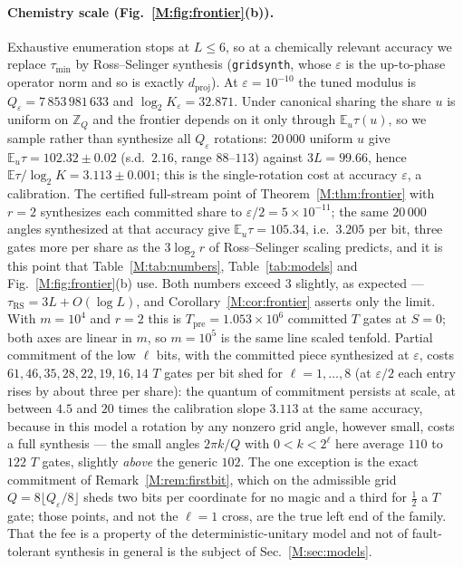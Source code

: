 \documentclass[aps,prx,twocolumn,superscriptaddress,nofootinbib,longbibliography]{revtex4-2}
\theoremstyle{plain}
\theoremstyle{definition}
\theoremstyle{remark}
\newcommand{\dproj}{d_{\mathrm{proj}}}
\newcommand{\Tpre}{T_{\mathrm{pre}}}
\newcommand{\E}{\mathbb{E}}
\newcommand{\Z}{\mathbb{Z}}
\begin{document}
\paragraph{Chemistry scale (Fig.~\ref{M:fig:frontier}(b)).} Exhaustive enumeration stops at $L\le6$, so at a chemically relevant accuracy we replace $\tau_{\min}$ by Ross--Selinger synthesis (\texttt{gridsynth}, whose $\varepsilon$ is the up-to-phase operator norm and so is exactly $\dproj$). At $\varepsilon=10^{-10}$ the tuned modulus is $Q_\varepsilon=7\,853\,981\,633$ and $\log_2K_\varepsilon=32.871$. Under canonical sharing the share $u$ is uniform on $\Z_Q$ and the frontier depends on it only through $\E_u\tau(u)$, so we sample rather than synthesize all $Q_\varepsilon$ rotations: $20\,000$ uniform $u$ give $\E_u\tau=102.32\pm0.02$ (s.d.\ $2.16$, range $88$--$113$) against $3L=99.66$, hence $\E\tau/\log_2K=3.113\pm0.001$; this is the single-rotation cost at accuracy $\varepsilon$, a calibration. The certified full-stream point of Theorem~\ref{M:thm:frontier} with $r=2$ synthesizes each committed share to $\varepsilon/2=5\times10^{-11}$; the same $20\,000$ angles synthesized at that accuracy give $\E_u\tau=105.34$, i.e.\ $3.205$ per bit, three gates more per share as the $3\log_2r$ of Ross--Selinger scaling predicts, and it is this point that Table~\ref{M:tab:numbers}, Table~\ref{tab:models} and Fig.~\ref{M:fig:frontier}(b) use. Both numbers exceed $3$ slightly, as expected --- $\tau_{\mathrm{RS}}=3L+O(\log L)$, and Corollary~\ref{M:cor:frontier} asserts only the limit. With $m=10^4$ and $r=2$ this is $\Tpre=1.053\times10^6$ committed $T$ gates at $S=0$; both axes are linear in $m$, so $m=10^5$ is the same line scaled tenfold. Partial commitment of the low $\ell$ bits, with the committed piece synthesized at $\varepsilon$, costs $61,46,35,28,22,19,16,14$ $T$ gates per bit shed for $\ell=1,\dots,8$ (at $\varepsilon/2$ each entry rises by about three per share): the quantum of commitment persists at scale, at between $4.5$ and $20$ times the calibration slope $3.113$ at the same accuracy, because in this model a rotation by any nonzero grid angle, however small, costs a full synthesis --- the small angles $2\pi k/Q$ with $0<k<2^\ell$ here average $110$ to $122$ $T$ gates, slightly \emph{above} the generic $102$. The one exception is the exact commitment of Remark~\ref{M:rem:firstbit}, which on the admissible grid $Q=8\lfloor Q_\varepsilon/8\rfloor$ sheds two bits per coordinate for no magic and a third for $\tfrac12$ a $T$ gate; those points, and not the $\ell=1$ cross, are the true left end of the family. That the fee is a property of the deterministic-unitary model and not of fault-tolerant synthesis in general is the subject of Sec.~\ref{M:sec:models}.
\end{document}
